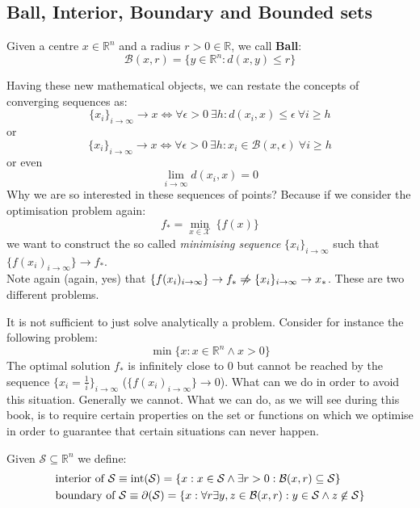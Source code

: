 \subsection{Ball, Interior, Boundary and Bounded sets}
\begin{definition}
    Given a centre $x \in \mathbb{R}^n$ and a radius $r > 0 \in \mathbb{R}$, we call \textbf{Ball}:
    \[
        \mathcal{B}(x,r) = \{y \in \mathbb{R}^n : d(x,y) \leq r\}
    \]
    \label{def:ball}
\end{definition}
Having these new mathematical objects, we can restate the concepts of converging sequences as:
\[
    \{x_i\}_{i \rightarrow \infty} \rightarrow x \iff \forall\epsilon > 0\ \exists h : d(x_i,x) \leq \epsilon\ \forall i \geq h
\]
or
\[
    \{x_i\}_{i \rightarrow \infty} \rightarrow x \iff \forall\epsilon > 0\ \exists h : x_i \in \mathcal{B}(x,\epsilon)\ \forall i \geq h
\]
or even
\[
    \lim_{i \rightarrow \infty} d(x_i,x) = 0
\]
Why we are so interested in these sequences of points? Because if we consider the optimisation problem again:
\[
    f_{*} = \min_{x \in \mathcal{X}}\ \{f(x)\}
\]
we want to construct the so called \textit{minimising sequence} $\{x_i\}_{i \rightarrow \infty}$ such that $\{f(x_i)_{i \rightarrow \infty}\} \rightarrow f_{*}$.\\
Note again (again, yes) that $\{f(x_i)_{i \rightarrow \infty}\} \rightarrow f_{*} \centernot\Rightarrow \{x_i\}_{i \rightarrow \infty} \rightarrow x_{*}$. These are two different problems.
\par It is not sufficient to just solve analytically a problem. Consider for instance the following problem:
\[
    \min \{x : x \in \mathbb{R}^n \wedge x > 0\}
\]
The optimal solution $f_{*}$ is infinitely close to 0 but cannot be reached by the sequence $\{x_i = \frac{1}{i}\}_{i \rightarrow \infty}$ ($\{f(x_i)_{i \rightarrow \infty}\} \rightarrow 0$). What can we do in order to avoid this situation. Generally we cannot. What we can do, as we will see during this book, is to require certain properties on the set or functions on which we optimise in order to guarantee that certain situations can never happen.
\begin{definition}
    Given $\mathcal{S} \subseteq \mathbb{R}^n$ we define:
    \begin{align}
        &\text{interior of $\mathcal{S}$} \equiv \text{int}(\mathcal{S}) = \{x : x \in \mathcal{S} \wedge \exists r > 0 : \mathcal{B}(x,r) \subseteq \mathcal{S}\}\\
        &\text{boundary of $\mathcal{S}$} \equiv \partial(\mathcal{S}) = \{x : \forall r \exists y,z \in \mathcal{B}(x,r) : y \in \mathcal{S} \wedge z \centernot \in \mathcal{S}\}
    \end{align}
\end{definition}
